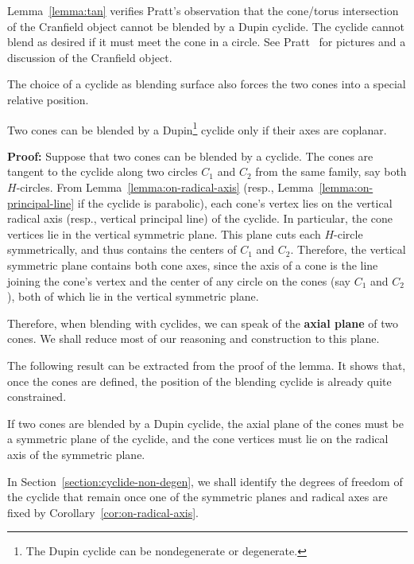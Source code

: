 \begin{remark}
Lemma~\ref{lemma:tan} verifies Pratt's observation that the 
cone/torus intersection of the Cranfield object
cannot be blended by a Dupin cyclide.
The cyclide cannot blend as desired if it must meet the cone in a circle.
See Pratt~\cite{pratt:1990} for pictures and a discussion of the Cranfield 
object.
\end{remark}

The choice of a cyclide as blending surface also forces the two 
cones into a special relative position.


\begin{lemma}
\label{lemma:coplanar}
Two cones can be blended by a Dupin\footnote{The Dupin 
		cyclide can be nondegenerate or degenerate.}
cyclide only if their axes are coplanar.
\end{lemma}
{\bf Proof:}  Suppose that two cones can be blended by a
cyclide.  The cones are tangent to the
cyclide along two circles $C_1$ and $C_2$ from the same family,
say both $H$-circles.  From Lemma~\ref{lemma:on-radical-axis} 
(resp., Lemma~\ref{lemma:on-principal-line} if the cyclide is parabolic),
each cone's vertex lies on the vertical radical axis 
(resp., vertical principal line) of the cyclide.  
In particular, the cone vertices 
lie in the vertical symmetric plane.  This plane cuts
each $H$-circle symmetrically, and thus
contains the centers of $C_1$ and $C_2$.  
Therefore, the vertical symmetric plane contains both cone axes,
since the axis of a cone is the line joining the cone's
vertex and the center of any circle on the cones (say $C_1$ and $C_2$),
both of which lie in the vertical symmetric plane.
\QED

Therefore, when blending with cyclides, we can speak of the
{\bf axial plane} of two cones.
We shall reduce most of our reasoning and construction to this plane.

The following result can be extracted from the proof of the lemma.
It shows that, once the cones are defined, the position of the blending
cyclide is already quite constrained.

\begin{cor}
\label{cor:on-radical-axis}
If two cones are blended by a Dupin cyclide,
the axial plane of the cones must be a symmetric plane of the cyclide,
and the cone vertices must lie on the radical axis of the symmetric plane.
\end{cor}

\noindent In Section~\ref{section:cyclide-non-degen}, 
we shall identify the degrees of freedom of 
the cyclide that remain once one of the symmetric planes and radical axes
are fixed by Corollary~\ref{cor:on-radical-axis}.

